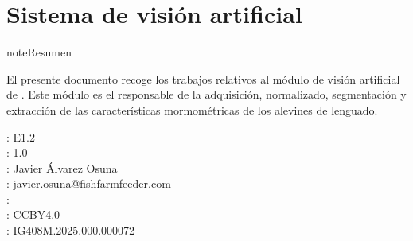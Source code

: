 \documentclass[a4paper,10pt,spanish]{jupyterBook}
\begin{document}
\chapter{Sistema de visión artificial}
\label{\detokenize{content/01/Imagen:sistema-de-vision-artificial}}\label{\detokenize{content/01/Imagen::doc}}
\begin{sphinxadmonition}{note}{Resumen}

\sphinxAtStartPar
El presente documento recoge los trabajos relativos al módulo de visión artificial de . Este módulo es el responsable de la adquisición, normalizado, segmentación y extracción de las características mormométricas de los alevines de lenguado.

\sphinxAtStartPar
{}: E1.2\\
: 1.0\\
: Javier Álvarez Osuna\\
: javier.osuna@fishfarmfeeder.com\\
: \\
: CC\sphinxhyphen{}BY\sphinxhyphen{}4.0\\
: IG408M.2025.000.000072

\begin{figure}[H]
\centering

\noindent{}
\end{figure}
\end{sphinxadmonition}
\end{document}
